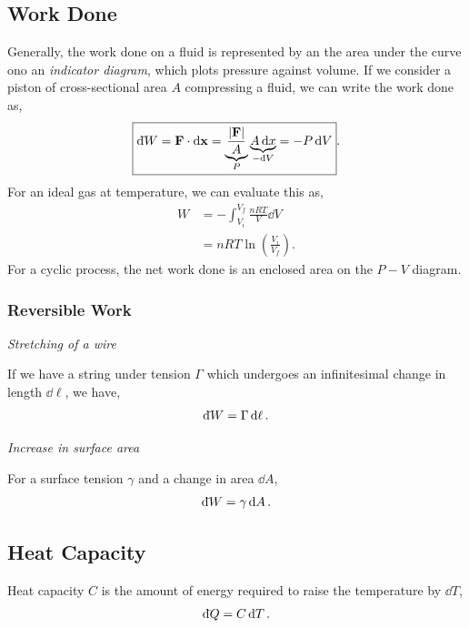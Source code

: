 \documentclass{book}
\newcommand{\dbar}{\mathrm{d}\hspace*{-0.08em}\bar{}\hspace*{0.1em}}
\begin{document}
\subsection{Work Done}
Generally, the work done on a fluid is represented by an the area under the curve ono an \textit{indicator diagram}, which plots pressure against volume. If we consider a piston of cross-sectional area $A$ compressing a fluid, we can write the work done as,
\begin{equation}
	\boxed{\dbar W = \vb{F}\cdot\dd{\vb{x}} = \underbrace{\frac{|\vb{F}|}{A}}_P \underbrace{A\dd{x}}_{-\dd{V}} = -P\dd{V}}. \label{eq:work}
\end{equation}
For an ideal gas at temperature, we can evaluate this as,
\begin{equation}
	\begin{split}
	W & = -\int_{V_i}^{V_f} \frac{nRT}{V}\dd{V} \\
	& = nRT\ln\left(\frac{V_i}{V_f}\right).
	\end{split}
\end{equation}
For a cyclic process, the net work done is an enclosed area on the $P-V$ diagram.
\subsubsection{Reversible Work}
\begin{center}\textit{Stretching of a wire}\end{center}
If we have a string under tension $\Gamma$ which undergoes an infinitesimal change in length $\dd{\ell}$, we have,
\begin{equation}
	\dbar W = \Gamma \dd{\ell}.
\end{equation}
\begin{center}\textit{Increase in surface area}\end{center}
For a surface tension $\gamma$ and a change in area $\dd{A}$,
\begin{equation}
	\dbar W = \gamma \dd{A}.
\end{equation}
\subsection{Heat Capacity}
Heat capacity $C$ is the amount of energy required to raise the temperature by $\dd{T}$,
\begin{equation}
	\dbar Q = C\dd{T}.
\end{equation}
\end{document}
